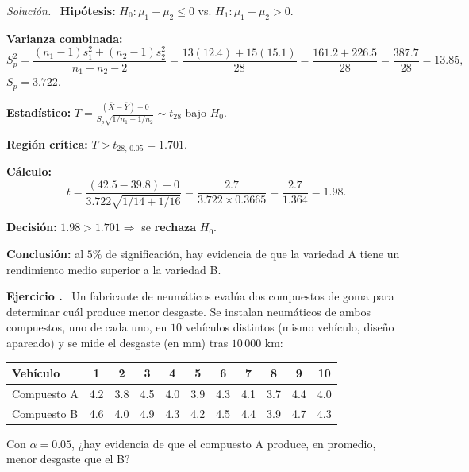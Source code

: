 \documentclass[11pt,a4paper]{article}
\newcounter{ejnum}
\newenvironment{ejercicio}{\refstepcounter{ejnum}\par\medskip\noindent\textbf{Ejercicio \theejnum.}~}{\par}
\newenvironment{solucion}{\par\noindent\textit{Solución.}~}{\par\vspace{1em}}
\begin{document}
\begin{solucion}
\textbf{Hipótesis:} $H_0:\mu_1-\mu_2\le0$ vs. $H_1:\mu_1-\mu_2>0$.

\textbf{Varianza combinada:}
\[
S_p^2=\frac{(n_1-1)s_1^2+(n_2-1)s_2^2}{n_1+n_2-2}=\frac{13(12.4)+15(15.1)}{28}=\frac{161.2+226.5}{28}=\frac{387.7}{28}=13.85,
\]
$S_p=3.722$.

\textbf{Estadístico:} $\displaystyle T=\frac{(\overline{X}-\overline{Y})-0}{S_p\sqrt{1/n_1+1/n_2}}\sim t_{28}$ bajo $H_0$.

\textbf{Región crítica:} $T>t_{28,\,0.05}=1.701$.

\textbf{Cálculo:}
\[
t=\frac{(42.5-39.8)-0}{3.722\sqrt{1/14+1/16}}=\frac{2.7}{3.722\times0.3665}=\frac{2.7}{1.364}=1.98.
\]

\textbf{Decisión:} $1.98>1.701\Rightarrow$ se \textbf{rechaza} $H_0$.

\textbf{Conclusión:} al $5\%$ de significación, hay evidencia de que la variedad A tiene un rendimiento medio superior a la variedad B.
\end{solucion}

\begin{ejercicio}
Un fabricante de neumáticos evalúa dos compuestos de goma para determinar cuál produce menor desgaste. Se instalan neumáticos de ambos compuestos, uno de cada uno, en $10$ vehículos distintos (mismo vehículo, diseño apareado) y se mide el desgaste (en mm) tras $10\,000$ km:
\begin{center}
\begin{tabular}{@{}lcccccccccc@{}}
\toprule
Vehículo & 1 & 2 & 3 & 4 & 5 & 6 & 7 & 8 & 9 & 10 \\
\midrule
Compuesto A & 4.2 & 3.8 & 4.5 & 4.0 & 3.9 & 4.3 & 4.1 & 3.7 & 4.4 & 4.0 \\
Compuesto B & 4.6 & 4.0 & 4.9 & 4.3 & 4.2 & 4.5 & 4.4 & 3.9 & 4.7 & 4.3 \\
\bottomrule
\end{tabular}
\end{center}
Con $\alpha=0.05$, ¿hay evidencia de que el compuesto A produce, en promedio, menor desgaste que el B?
\end{ejercicio}
\end{document}
